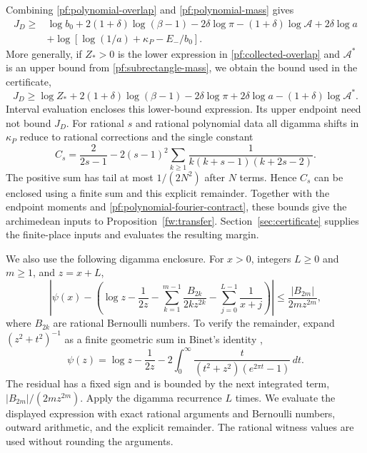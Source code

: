 Combining \eqref{pf:polynomial-overlap} and
\eqref{pf:polynomial-mass} gives
\begin{equation}\label{pf:polynomial-functional}
 \begin{split}
 J_D\ge{}&\log b_0+2(1+\delta)\log(\beta-1)-2\delta\log\pi
 -(1+\delta)\log\mathcal A+2\delta\log a\\
 &+\log[\log(1/a)+\kappa_P-E_-/b_0].
 \end{split}
\end{equation}
More generally, if $Z_*>0$ is the lower expression in
\eqref{pf:collected-overlap} and $\mathcal A^*$ is an upper bound from
\eqref{pf:subrectangle-mass}, we obtain the bound used in the certificate,
\begin{equation}\label{pf:collected-functional}
 J_D\ge\log Z_*+2(1+\delta)\log(\beta-1)-2\delta\log\pi
       +2\delta\log a-(1+\delta)\log\mathcal A^*.
\end{equation}
Interval evaluation encloses this lower-bound expression. Its upper
endpoint need not bound $J_D$.
For rational $s$ and rational polynomial data all digamma shifts in
$\kappa_P$ reduce to rational corrections and the single constant
\[
 C_s=\frac2{2s-1}-2(s-1)^2
 \sum_{k\ge1}\frac1{k(k+s-1)(k+2s-2)}.
\]
The positive sum has tail at most $1/(2N^2)$ after $N$ terms. Hence
$C_s$ can be enclosed using a finite sum and this explicit remainder.
Together with the endpoint moments and
\eqref{pf:polynomial-fourier-contract}, these bounds give the
archimedean inputs to Proposition~\ref{fw:transfer}.
Section~\ref{sec:certificate} supplies the finite-place inputs and
evaluates the resulting margin.

We also use the following digamma enclosure. For $x>0$, integers $L\ge0$
and $m\ge1$, and $z=x+L$,
\[
 \left|\psi(x)-\left(\log z-\frac1{2z}
 -\sum_{k=1}^{m-1}\frac{B_{2k}}{2kz^{2k}}
 -\sum_{j=0}^{L-1}\frac1{x+j}\right)\right|
 \le\frac{|B_{2m}|}{2m z^{2m}},
\]
where $B_{2k}$ are rational Bernoulli numbers. To verify the remainder,
expand $(z^2+t^2)^{-1}$ as a finite geometric sum in Binet's identity
\cite[Equation~(5.9.15)]{DLMF},
\[
 \psi(z)=\log z-\frac1{2z}
 -2\int_0^\infty\frac{t}{(t^2+z^2)(e^{2\pi t}-1)}\,dt.
\]
The residual has a fixed sign and is bounded by the next integrated term,
$|B_{2m}|/(2m z^{2m})$. Apply the digamma recurrence $L$ times.
We evaluate the displayed expression with exact rational arguments and
Bernoulli numbers, outward arithmetic, and the explicit remainder.
The rational witness values are used without rounding the arguments.
